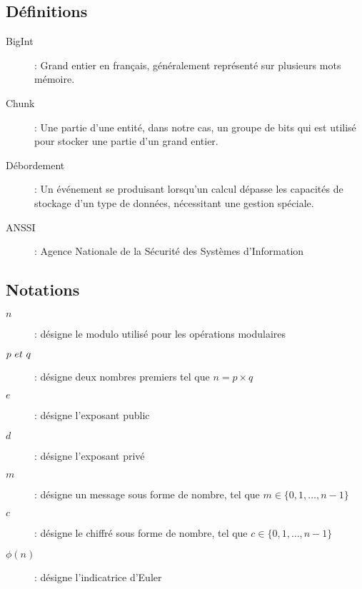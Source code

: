 \subsection{Définitions}
\begin{description}
    \item[BigInt] : Grand entier en français, généralement représenté sur plusieurs mots mémoire.
    \item[Chunk] : Une partie d'une entité, dans notre cas, un groupe de bits qui est utilisé pour stocker une partie d'un grand entier.
    \item[Débordement] : Un événement se produisant lorsqu'un calcul dépasse les capacités de stockage d'un type de données, nécessitant une gestion spéciale.
    \item[ANSSI] : Agence Nationale de la Sécurité des Systèmes d'Information
\end{description}

\subsection{Notations}
\begin{description}
    \item[$n$] : désigne le modulo utilisé pour les opérations modulaires
    \item[$p~\normalfont{et}~q$] : désigne deux nombres premiers tel que $n = p \times q$
    \item[$e$] : désigne l'exposant public
    \item[$d$] : désigne l'exposant privé
    \item[$m$] : désigne un message sous forme de nombre, tel que $m \in \{0, 1, \ldots, n-1\}$
    \item[$c$] : désigne le chiffré sous forme de nombre, tel que $c \in \{0, 1, \ldots, n-1\}$
    \item[$\phi(n)$] : désigne l'indicatrice d'Euler
\end{description}

